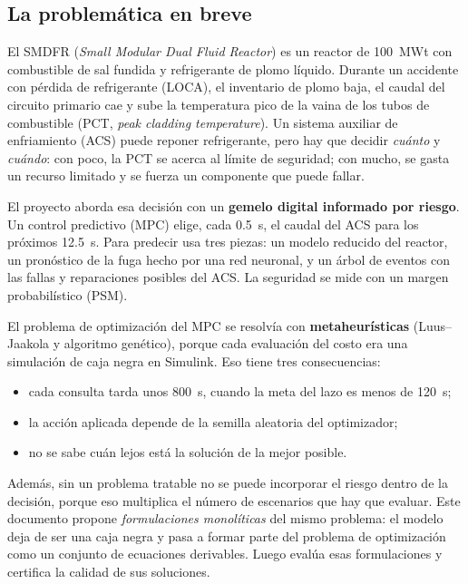 \subsection{La problemática en breve}
El SMDFR (\emph{Small Modular Dual Fluid Reactor}) es un reactor de 100~MWt con combustible
de sal fundida y refrigerante de plomo líquido. Durante un accidente con pérdida de
refrigerante (LOCA), el inventario de plomo baja, el caudal del circuito primario cae y sube
la temperatura pico de la vaina de los tubos de combustible (PCT, \emph{peak cladding
temperature}). Un sistema auxiliar de enfriamiento (ACS) puede reponer refrigerante, pero
hay que decidir \emph{cuánto} y \emph{cuándo}: con poco, la PCT se acerca al límite de
seguridad; con mucho, se gasta un recurso limitado y se fuerza un componente que puede
fallar.

El proyecto aborda esa decisión con un \textbf{gemelo digital informado por riesgo}. Un
control predictivo (MPC) elige, cada 0.5~s, el caudal del ACS para los próximos 12.5~s.
Para predecir usa tres piezas: un modelo reducido del reactor, un pronóstico de la fuga
hecho por una red neuronal, y un árbol de eventos con las fallas y reparaciones posibles del
ACS. La seguridad se mide con un margen probabilístico (PSM).

El problema de optimización del MPC se resolvía con \textbf{metaheurísticas}
(Luus--Jaakola y algoritmo genético), porque cada evaluación del costo era una simulación de
caja negra en Simulink. Eso tiene tres consecuencias:
\begin{itemize}
  \item cada consulta tarda unos 800~s, cuando la meta del lazo es menos de 120~s;
  \item la acción aplicada depende de la semilla aleatoria del optimizador;
  \item no se sabe cuán lejos está la solución de la mejor posible.
\end{itemize}
Además, sin un problema tratable no se puede incorporar el riesgo dentro de la decisión,
porque eso multiplica el número de escenarios que hay que evaluar. Este documento propone
\emph{formulaciones monolíticas} del mismo problema: el modelo deja de ser una caja negra y
pasa a formar parte del problema de optimización como un conjunto de ecuaciones derivables.
Luego evalúa esas formulaciones y certifica la calidad de sus soluciones.

